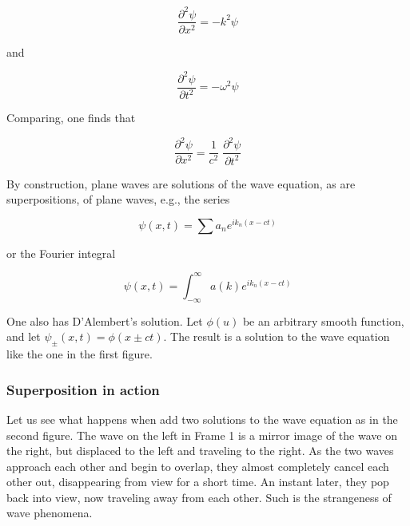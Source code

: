 \begin{equation}
\frac{\partial^2 \psi}{\partial x^2} = - k^2 \psi
\end{equation}

and

\begin{equation}
\frac{\partial^2 \psi}{\partial t^2} = - \omega^2 \psi
\end{equation}

Comparing, one finds that

\begin{equation}
\frac{\partial^2 \psi}{\partial x^2} = \frac{1}{c^2} \;\frac{\partial^2 \psi}{\partial t^2}
\end{equation}

By construction, plane waves are solutions of the wave equation, as are superpositions, of plane waves, e.g., the series

\begin{equation}
\psi(x,t) = \sum a_n e^{ik_n(x - ct)}
\end{equation}

or the Fourier integral

\begin{equation}
\psi(x,t) = \int_{-\infty}^\infty a(k)e^{ik_n(x - ct)}
\end{equation}

One also has D'Alembert's solution.  Let $\phi(u)$ be an arbitrary smooth function, and let $\psi_{\pm}(x,t)  = \phi(x \pm ct)$.  The result is a solution to the wave equation like the one in the first figure.

\subsubsection{Superposition in action}


Let us see what happens when add two solutions to the wave equation as in the second figure.  The wave on the left in Frame 1 is a mirror image of the wave on the right, but displaced to the left and traveling to the right.  As the two waves approach each other and  begin to overlap, they almost completely cancel each other out, disappearing from view for a short time.  An instant later, they pop back into view, now traveling away from each other.   Such is the strangeness of wave phenomena.

